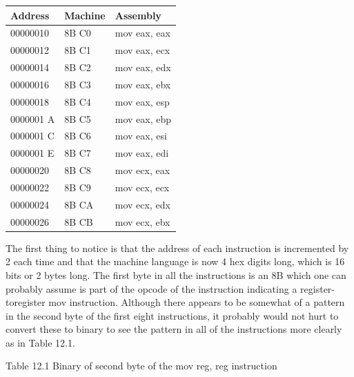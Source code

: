 \documentclass[10pt]{book}
\begin{document}
\begin{center}
\begin{center}
\begin{center}
\begin{center}
\begin{center}
\begin{center}
\begin{tabular}{|l|l|l|}
\hline
Address & Machine & Assembly \\
\hline
00000010 & 8B C0 & mov eax, eax \\
\hline
00000012 & 8B C1 & mov eax, ecx \\
\hline
00000014 & 8B C2 & mov eax, edx \\
\hline
00000016 & 8B C3 & mov eax, ebx \\
\hline
00000018 & 8B C4 & mov eax, esp \\
\hline
0000001 A & 8B C5 & mov eax, ebp \\
\hline
0000001 C & 8B C6 & mov eax, esi \\
\hline
0000001 E & 8B C7 & mov eax, edi \\
\hline
00000020 & 8B C8 & mov ecx, eax \\
\hline
00000022 & 8B C9 & mov ecx, ecx \\
\hline
00000024 & 8B CA & mov ecx, edx \\
\hline
00000026 & 8B CB & mov ecx, ebx \\
\hline
\end{tabular}
\end{center}

The first thing to notice is that the address of each instruction is incremented by 2 each time and that the machine language is now 4 hex digits long, which is 16 bits or 2 bytes long. The first byte in all the instructions is an 8B which one can probably assume is part of the opcode of the instruction indicating a register-toregister mov instruction. Although there appears to be somewhat of a pattern in the second byte of the first eight instructions, it probably would not hurt to convert these to binary to see the pattern in all of the instructions more clearly as in Table 12.1.

Table 12.1 Binary of second byte of the mov reg, reg instruction


\end{center}
\end{center}
\end{center}
\end{center}
\end{center}
\end{document}
